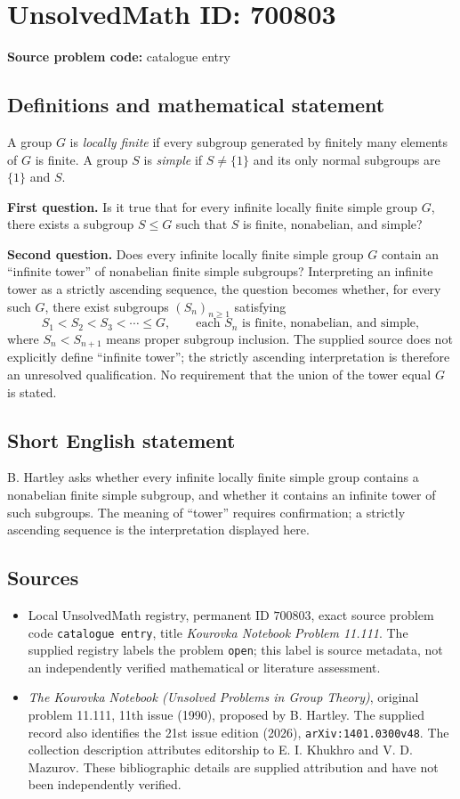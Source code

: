 \documentclass[11pt]{article}
\begin{document}
\section*{UnsolvedMath ID: 700803}
\textbf{Source problem code:} catalogue entry
\subsection{Definitions and mathematical statement}
A group \(G\) is \emph{locally finite} if every subgroup generated by finitely many elements of \(G\) is finite. A group \(S\) is \emph{simple} if \(S\neq\{1\}\) and its only normal subgroups are \(\{1\}\) and \(S\).

\textbf{First question.} Is it true that for every infinite locally finite simple group \(G\), there exists a subgroup \(S\leq G\) such that \(S\) is finite, nonabelian, and simple?

\textbf{Second question.} Does every infinite locally finite simple group \(G\) contain an ``infinite tower'' of nonabelian finite simple subgroups? Interpreting an infinite tower as a strictly ascending sequence, the question becomes whether, for every such \(G\), there exist subgroups \((S_n)_{n\geq 1}\) satisfying
\[
S_1<S_2<S_3<\cdots\leq G,
\qquad
\text{each }S_n\text{ is finite, nonabelian, and simple},
\]
where \(S_n<S_{n+1}\) means proper subgroup inclusion. The supplied source does not explicitly define ``infinite tower''; the strictly ascending interpretation is therefore an unresolved qualification. No requirement that the union of the tower equal \(G\) is stated.
\subsection{Short English statement}
B. Hartley asks whether every infinite locally finite simple group contains a nonabelian finite simple subgroup, and whether it contains an infinite tower of such subgroups. The meaning of ``tower'' requires confirmation; a strictly ascending sequence is the interpretation displayed here.
\subsection{Sources}
\begin{itemize}
\item Local UnsolvedMath registry, permanent ID \(700803\), exact source problem code \texttt{catalogue entry}, title \emph{Kourovka Notebook Problem 11.111}. The supplied registry labels the problem \texttt{open}; this label is source metadata, not an independently verified mathematical or literature assessment.
\item \emph{The Kourovka Notebook (Unsolved Problems in Group Theory)}, original problem 11.111, 11th issue (1990), proposed by B. Hartley. The supplied record also identifies the 21st issue edition (2026), \texttt{arXiv:1401.0300v48}. The collection description attributes editorship to E. I. Khukhro and V. D. Mazurov. These bibliographic details are supplied attribution and have not been independently verified.
\end{itemize}
\end{document}
